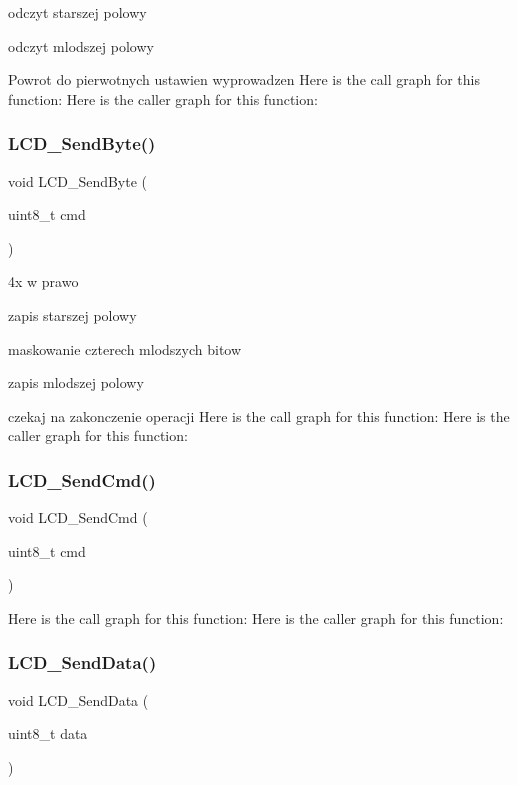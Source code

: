 odczyt starszej polowy

odczyt mlodszej polowy

Powrot do pierwotnych ustawien wyprowadzen Here is the call graph for this function\+:
Here is the caller graph for this function\+:
\mbox{\label{lcd4bit_8c_a17ebb04f0339e3ad2399a6b95f1409e7}} 
\subsubsection{L\+C\+D\+\_\+\+Send\+Byte()}
{\footnotesize\ttfamily void L\+C\+D\+\_\+\+Send\+Byte (\begin{DoxyParamCaption}\item[{uint8\+\_\+t}]{cmd }\end{DoxyParamCaption})}

4x w prawo

zapis starszej polowy

maskowanie czterech mlodszych bitow

zapis mlodszej polowy

czekaj na zakonczenie operacji Here is the call graph for this function\+:
Here is the caller graph for this function\+:
\mbox{\label{lcd4bit_8c_a6fe412af8613c79d0e88b03b012265dc}} 
\subsubsection{L\+C\+D\+\_\+\+Send\+Cmd()}
{\footnotesize\ttfamily void L\+C\+D\+\_\+\+Send\+Cmd (\begin{DoxyParamCaption}\item[{uint8\+\_\+t}]{cmd }\end{DoxyParamCaption})}

Here is the call graph for this function\+:
Here is the caller graph for this function\+:
\mbox{\label{lcd4bit_8c_aa09da605411449b125a3734940ca8f41}} 
\subsubsection{L\+C\+D\+\_\+\+Send\+Data()}
{\footnotesize\ttfamily void L\+C\+D\+\_\+\+Send\+Data (\begin{DoxyParamCaption}\item[{uint8\+\_\+t}]{data }\end{DoxyParamCaption})}

